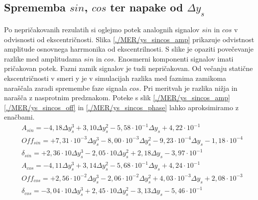 \subsection{Sprememba $sin$, $cos$ ter napake od $\Delta y_s$}
Po nepričakovanih rezulatih si oglejmo potek analognih signalov $sin$ in $cos$ v odvisnosti od ekscentričnosti. Slika \ref{./MER/ys_sincos_amp} prikazuje odvistnost amplitude osnovnega harrmonika od ekscentrilnosti. S slike je opaziti povečevanje razlike med amplitudama $sin$ in $cos$. Enosmerni komponenti signalov imati pričakovan potek. Fazni zamik signalov je tudi nepričakovan. Od večanju statične ekscentričnosti v smeri y je v simulacijah razlika med faznima zamikoma naraščala zaradi spremembe faze signala $cos$.
Pri meritvah je razlika nižja in narašča z nasprotnim predznakom.
Poteke s slik \ref{./MER/ys_sincos_amp} \ref{./MER/ys_sincos_off} in \ref{./MER/ys_sincos_phase} lahko aproksimiramo z enačbami. 
\begin{eqnarray}   
&A_{sin} = -4,18\Delta y_s^3+3,10\Delta y_s^2-5,58\cdot 10^{-1} \Delta y_s+4,22\cdot 10^{-1} \\     
&Off_{sin} = +7,31\cdot 10^{-3} \Delta y_s^3-8,00\cdot 10^{-3} \Delta y_s^2-9,23\cdot 10^{-4} \Delta y_s-1,18\cdot 10^{-4} \\   
&\delta_{sin} = +2,36\cdot 10\Delta y_s^3-2,05\cdot 10\Delta y_s^2+2,18\Delta y_s-3,97\cdot 10^{-1} \\
&A_{cos} = -4,11\Delta y_s^3+3,14\Delta y_s^2-5,68\cdot 10^{-1} \Delta y_s+4,24\cdot 10^{-1} \\     
&Off_{cos} = +2,56\cdot 10^{-2}\Delta y_s^3-2,06\cdot 10^{-2}\Delta y_s^2+4,03\cdot 10^{-3}\Delta y_s+2,08\cdot 10^{-3} \\   
&\delta_{cos} = -3,04\cdot 10\Delta y_s^3+2,45\cdot 10\Delta y_s^2-3,13\Delta y_s-5,46\cdot 10^{-1} 
\end{eqnarray}


